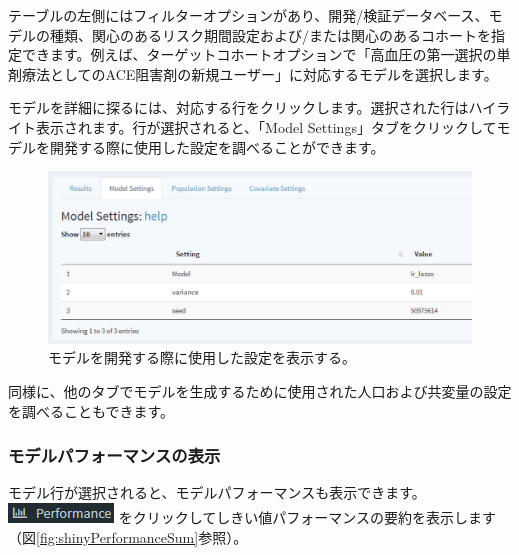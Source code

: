 \documentclass[
  11pt]{book}
\theoremstyle{definition}
\theoremstyle{definition}
\theoremstyle{definition}
\theoremstyle{definition}
\theoremstyle{remark}
\begin{document}
テーブルの左側にはフィルターオプションがあり、開発/検証データベース、モデルの種類、関心のあるリスク期間設定および/または関心のあるコホートを指定できます。例えば、ターゲットコホートオプションで「高血圧の第一選択の単剤療法としてのACE阻害剤の新規ユーザー」に対応するモデルを選択します。

モデルを詳細に探るには、対応する行をクリックします。選択された行はハイライト表示されます。行が選択されると、「Model Settings」タブをクリックしてモデルを開発する際に使用した設定を調べることができます。

\begin{figure}

{\centering \includegraphics[width=1\linewidth]{images/PatientLevelPrediction/shiny/shinyModel} 

}

\caption{モデルを開発する際に使用した設定を表示する。}\label{fig:shinyModel}
\end{figure}

同様に、他のタブでモデルを生成するために使用された人口および共変量の設定を調べることもできます。

\subsubsection*{モデルパフォーマンスの表示}\label{ux30e2ux30c7ux30ebux30d1ux30d5ux30a9ux30fcux30deux30f3ux30b9ux306eux8868ux793a}

モデル行が選択されると、モデルパフォーマンスも表示できます。\includegraphics{images/PatientLevelPrediction/performance.png} をクリックしてしきい値パフォーマンスの要約を表示します（図\ref{fig:shinyPerformanceSum}参照）。
\end{document}
